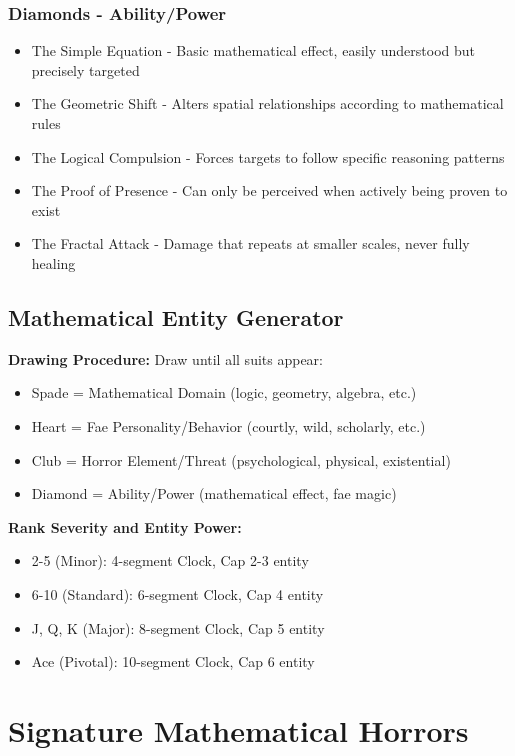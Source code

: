 \documentclass[11pt]{article}
\begin{document}
\subsubsection{Diamonds - Ability/Power}

\begin{itemize}
\item The Simple Equation - Basic mathematical effect, easily understood but precisely targeted
\item The Geometric Shift - Alters spatial relationships according to mathematical rules
\item The Logical Compulsion - Forces targets to follow specific reasoning patterns
\item The Proof of Presence - Can only be perceived when actively being proven to exist
\item The Fractal Attack - Damage that repeats at smaller scales, never fully healing
\end{itemize}

\subsection{Mathematical Entity Generator}

\textbf{Drawing Procedure:} Draw until all suits appear:
\begin{itemize}
\item Spade = Mathematical Domain (logic, geometry, algebra, etc.)
\item Heart = Fae Personality/Behavior (courtly, wild, scholarly, etc.)
\item Club = Horror Element/Threat (psychological, physical, existential)
\item Diamond = Ability/Power (mathematical effect, fae magic)
\end{itemize}

\textbf{Rank Severity and Entity Power:}
\begin{itemize}
\item 2-5 (Minor): 4-segment Clock, Cap 2-3 entity
\item 6-10 (Standard): 6-segment Clock, Cap 4 entity
\item J, Q, K (Major): 8-segment Clock, Cap 5 entity
\item Ace (Pivotal): 10-segment Clock, Cap 6 entity
\end{itemize}

\section{Signature Mathematical Horrors}
\end{document}

